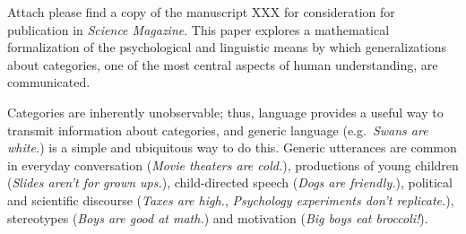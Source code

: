 \documentclass[11pt,stdletter,dateno,sigleft]{newlfm} %
\begin{document}
\begin{newlfm}


%
%
%

Attach please find a copy of the manuscript XXX %
 for consideration for publication in \emph{Science Magazine}. 
This paper explores a mathematical formalization of the psychological and linguistic means by which generalizations about categories, one of the most central aspects of human understanding, are communicated.  


Categories are inherently unobservable; thus, language provides a useful way to transmit information about categories, and generic language (e.g.~\emph{Swans are white.}) is a simple and ubiquitous way to do this. 
Generic utterances are common in everyday conversation (\emph{Movie theaters are cold.}), productions of young children (\emph{Slides aren't for grown ups.}), child-directed speech (\emph{Dogs are friendly.}), political and scientific discourse (\emph{Taxes are high.}, \emph{Psychology experiments don't replicate.}), stereotypes (\emph{Boys are good at math.}) and motivation (\emph{Big boys eat broccoli!}).


\end{newlfm}
\end{document}
